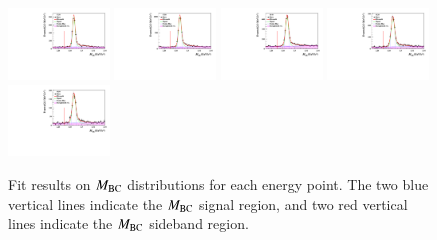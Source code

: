 \begin{figure}
    \includegraphics[width=0.24\textwidth]{figure/fit_mbc/fit_mBC_data4750.pdf}
    \includegraphics[width=0.24\textwidth]{figure/fit_mbc/fit_mBC_data4780.pdf}
    \includegraphics[width=0.24\textwidth]{figure/fit_mbc/fit_mBC_data4840.pdf}
    \includegraphics[width=0.24\textwidth]{figure/fit_mbc/fit_mBC_data4914.pdf}
    \includegraphics[width=0.24\textwidth]{figure/fit_mbc/fit_mBC_data4946.pdf}
    \caption{Fit results on $M_{\rm{BC}}$ distributions for each energy point. The two blue vertical lines indicate the $M_{\rm{BC}}$ signal region, and two red vertical lines indicate the $M_{\rm{BC}}$ sideband region.}
\label{fig:fit_mbc}
\end{figure}

